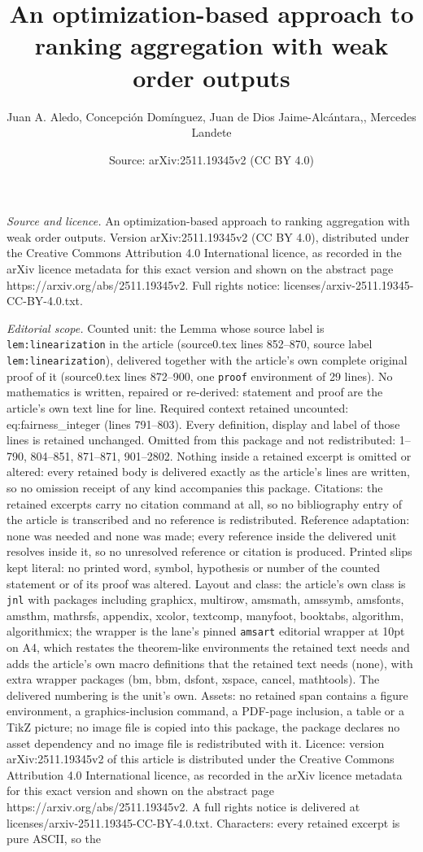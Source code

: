 \documentclass[10pt,a4paper]{amsart}
\title[An optimization-based approach to ranking aggregation with w]{An optimization-based approach to ranking aggregation with weak order outputs}
\author{Juan A. Aledo, Concepci\'on Dom\'inguez, Juan de Dios Jaime-Alc\'antara,, Mercedes Landete}
\date{Source: arXiv:2511.19345v2 (CC BY 4.0)}
\begin{document}
\maketitle

\noindent\emph{Source and licence.} An optimization-based approach to ranking aggregation with weak order outputs. Version arXiv:2511.19345v2 (CC BY 4.0), distributed under the Creative Commons Attribution 4.0 International licence, as recorded in the arXiv licence metadata for this exact version and shown on the abstract page https://arxiv.org/abs/2511.19345v2. Full rights notice: licenses/arxiv-2511.19345-CC-BY-4.0.txt.\par\smallskip

\noindent\textit{Editorial scope.} Counted unit: the Lemma whose source label is \texttt{lem:linearization} in the article (source0.tex lines 852--870, source label \texttt{lem:linearization}), delivered together with the article's own complete original proof of it (source0.tex lines 872--900, one \texttt{proof} environment of 29 lines). No mathematics is written, repaired or re-derived: statement and proof are the article's own text line for line. Required context retained uncounted: eq:fairness\_integer (lines 791--803). Every definition, display and label of those lines is retained unchanged. Omitted from this package and not redistributed: 1--790, 804--851, 871--871, 901--2802. Nothing inside a retained excerpt is omitted or altered: every retained body is delivered exactly as the article's lines are written, so no omission receipt of any kind accompanies this package. Citations: the retained excerpts carry no citation command at all, so no bibliography entry of the article is transcribed and no reference is redistributed. Reference adaptation: none was needed and none was made; every reference inside the delivered unit resolves inside it, so no unresolved reference or citation is produced. Printed slips kept literal: no printed word, symbol, hypothesis or number of the counted statement or of its proof was altered. Layout and class: the article's own class is \texttt{jnl} with packages including graphicx, multirow, amsmath, amssymb, amsfonts, amsthm, mathrsfs, appendix, xcolor, textcomp, manyfoot, booktabs, algorithm, algorithmicx; the wrapper is the lane's pinned \texttt{amsart} editorial wrapper at 10pt on A4, which restates the theorem-like environments the retained text needs and adds the article's own macro definitions that the retained text needs (none), with extra wrapper packages (bm, bbm, dsfont, xspace, cancel, mathtools). The delivered numbering is the unit's own. Assets: no retained span contains a figure environment, a graphics-inclusion command, a PDF-page inclusion, a table or a TikZ picture; no image file is copied into this package, the package declares no asset dependency and no image file is redistributed with it. Licence: version arXiv:2511.19345v2 of this article is distributed under the Creative Commons Attribution 4.0 International licence, as recorded in the arXiv licence metadata for this exact version and shown on the abstract page https://arxiv.org/abs/2511.19345v2. A full rights notice is delivered at licenses/arxiv-2511.19345-CC-BY-4.0.txt. Characters: every retained excerpt is pure ASCII, so the 
\end{document}
